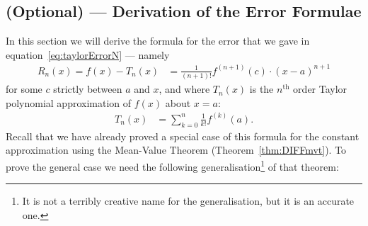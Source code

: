 \subsection{(Optional) --- Derivation of the Error Formulae}\label{subsec:GMVT}
In this section we will derive the formula for the error that we gave in
equation~\eqref{eq:taylorErrorN} --- namely
\begin{align*}
  R_n(x) = f(x) - T_n(x) &= \frac{1}{(n+1)!}f^{(n+1)}(c)\cdot (x-a)^{n+1}
\end{align*}
for some $c$ strictly between $a$ and $x$, and where $T_n(x)$ is the $n^\mathrm{th}$
order Taylor polynomial approximation of $f(x)$ about $x=a$:
\begin{align*}
  T_n(x) &= \sum_{k=0}^n \frac{1}{k!} f^{(k)}(a).
\end{align*}
Recall that we have already proved a special case of this formula for the constant
approximation using the Mean-Value Theorem (Theorem~\ref{thm:DIFFmvt}). To prove the
general case we need the following generalisation\footnote{It is not a terribly creative
name for the generalisation, but it is an accurate one.} of that theorem:

